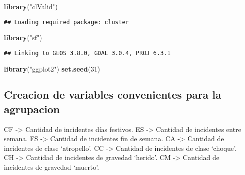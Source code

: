 \documentclass[
]{article}
\newenvironment{Shaded}{\begin{snugshade}}{\end{snugshade}}
\newcommand{\DecValTok}[1]{\textcolor[rgb]{0.00,0.00,0.81}{#1}}
\newcommand{\KeywordTok}[1]{\textcolor[rgb]{0.13,0.29,0.53}{\textbf{#1}}}
\newcommand{\NormalTok}[1]{#1}
\newcommand{\StringTok}[1]{\textcolor[rgb]{0.31,0.60,0.02}{#1}}
\begin{document}
\begin{Shaded}
\begin{Highlighting}[]
\KeywordTok{library}\NormalTok{(}\StringTok{"clValid"}\NormalTok{)}
\end{Highlighting}
\end{Shaded}

\begin{verbatim}
## Loading required package: cluster
\end{verbatim}

\begin{Shaded}
\begin{Highlighting}[]
\KeywordTok{library}\NormalTok{(}\StringTok{"sf"}\NormalTok{)}
\end{Highlighting}
\end{Shaded}

\begin{verbatim}
## Linking to GEOS 3.8.0, GDAL 3.0.4, PROJ 6.3.1
\end{verbatim}

\begin{Shaded}
\begin{Highlighting}[]
\KeywordTok{library}\NormalTok{(}\StringTok{"ggplot2"}\NormalTok{)}
\KeywordTok{set.seed}\NormalTok{(}\DecValTok{31}\NormalTok{)}
\end{Highlighting}
\end{Shaded}

\hypertarget{creacion-de-variables-convenientes-para-la-agrupacion}{%
\subsection{Creacion de variables convenientes para la
agrupacion}\label{creacion-de-variables-convenientes-para-la-agrupacion}}

CF -\textgreater{} Cantidad de incidentes días festivos. ES
-\textgreater{} Cantidad de incidentes entre semana. FS -\textgreater{}
Cantidad de incidentes fin de semana. CA -\textgreater{} Cantidad de
incidentes de clase `atropello'. CC -\textgreater{} Cantidad de
incidentes de clase `choque'. CH -\textgreater{} Cantidad de incidentes
de gravedad `herido'. CM -\textgreater{} Cantidad de incidentes de
gravedad `muerto'.
\end{document}
